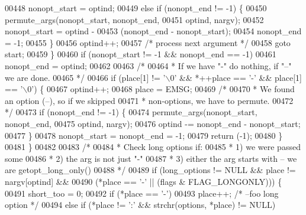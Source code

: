 \begin{DoxyCode}
{{{{{{{00448                 nonopt_start = optind;
00449             \textcolor{keywordflow}{else} \textcolor{keywordflow}{if} (nonopt_end != -1) \{
00450                 permute_args(nonopt_start, nonopt_end,
00451                     optind, nargv);
00452                 nonopt_start = optind -
00453                     (nonopt_end - nonopt_start);
00454                 nonopt_end = -1;
00455             \}
00456             optind++;
00457             \textcolor{comment}{/* process next argument */}
00458             \textcolor{keywordflow}{goto} start;
00459         \}
00460         \textcolor{keywordflow}{if} (nonopt_start != -1 && nonopt_end == -1)
00461             nonopt_end = optind;
00462 
00463         \textcolor{comment}{/*}
00464 \textcolor{comment}{         * If we have "-" do nothing, if "--" we are done.}
00465 \textcolor{comment}{         */}
00466         \textcolor{keywordflow}{if} (place[1] != \textcolor{charliteral}{'\(\backslash\)0'} && *++place == \textcolor{charliteral}{'-'} && place[1] == \textcolor{charliteral}{'\(\backslash\)0'}) \{
00467             optind++;
00468             place = EMSG;
00469             \textcolor{comment}{/*}
00470 \textcolor{comment}{             * We found an option (--), so if we skipped}
00471 \textcolor{comment}{             * non-options, we have to permute.}
00472 \textcolor{comment}{             */}
00473             \textcolor{keywordflow}{if} (nonopt_end != -1) \{
00474                 permute_args(nonopt_start, nonopt_end,
00475                     optind, nargv);
00476                 optind -= nonopt_end - nonopt_start;
00477             \}
00478             nonopt_start = nonopt_end = -1;
00479             \textcolor{keywordflow}{return} (-1);
00480         \}
00481     \}
00482 
00483     \textcolor{comment}{/*}
00484 \textcolor{comment}{     * Check long options if:}
00485 \textcolor{comment}{     *  1) we were passed some}
00486 \textcolor{comment}{     *  2) the arg is not just "-"}
00487 \textcolor{comment}{     *  3) either the arg starts with -- we are getopt\_long\_only()}
00488 \textcolor{comment}{     */}
00489     \textcolor{keywordflow}{if} (long\_options != NULL && place != nargv[optind] &&
00490         (*place == \textcolor{charliteral}{'-'} || (flags & FLAG_LONGONLY))) \{
00491         short\_too = 0;
00492         \textcolor{keywordflow}{if} (*place == \textcolor{charliteral}{'-'})
00493             place++;        \textcolor{comment}{/* --foo long option */}
00494         \textcolor{keywordflow}{else} \textcolor{keywordflow}{if} (*place != \textcolor{charliteral}{':'} && strchr(options, *place) != NULL)
}}}}}}}
\end{DoxyCode}
